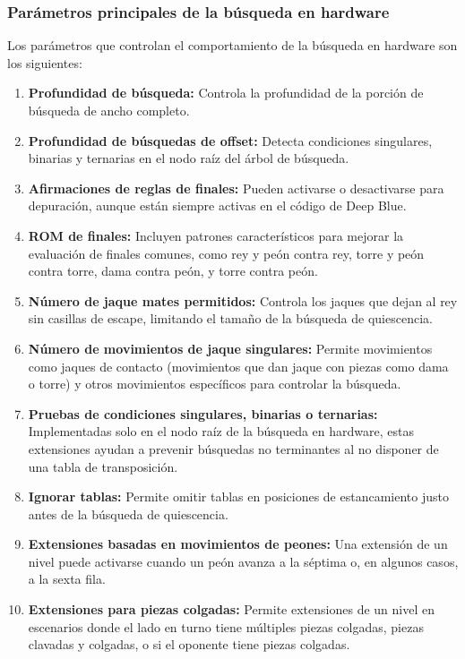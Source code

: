 \documentclass[12pt,a4paper]{article}
\begin{document}
\subsubsection*{Parámetros principales de la búsqueda en hardware}
Los parámetros que controlan el comportamiento de la búsqueda en hardware son los siguientes:
\begin{enumerate}
    \item \textbf{Profundidad de búsqueda:} Controla la profundidad de la porción de búsqueda de ancho completo.
    \item \textbf{Profundidad de búsquedas de offset:} Detecta condiciones singulares, binarias y ternarias en el nodo raíz del árbol de búsqueda.
    \item \textbf{Afirmaciones de reglas de finales:} Pueden activarse o desactivarse para depuración, aunque están siempre activas en el código de Deep Blue.
    \item \textbf{ROM de finales:} Incluyen patrones característicos para mejorar la evaluación de finales comunes, como rey y peón contra rey, torre y peón contra torre, dama contra peón, y torre contra peón.
    \item \textbf{Número de jaque mates permitidos:} Controla los jaques que dejan al rey sin casillas de escape, limitando el tamaño de la búsqueda de quiescencia.
    \item \textbf{Número de movimientos de jaque singulares:} Permite movimientos como jaques de contacto (movimientos que dan jaque con piezas como dama o torre) y otros movimientos específicos para controlar la búsqueda.
    \item \textbf{Pruebas de condiciones singulares, binarias o ternarias:} Implementadas solo en el nodo raíz de la búsqueda en hardware, estas extensiones ayudan a prevenir búsquedas no terminantes al no disponer de una tabla de transposición.
    \item \textbf{Ignorar tablas:} Permite omitir tablas en posiciones de estancamiento justo antes de la búsqueda de quiescencia.
    \item \textbf{Extensiones basadas en movimientos de peones:} Una extensión de un nivel puede activarse cuando un peón avanza a la séptima o, en algunos casos, a la sexta fila.
    \item \textbf{Extensiones para piezas colgadas:} Permite extensiones de un nivel en escenarios donde el lado en turno tiene múltiples piezas colgadas, piezas clavadas y colgadas, o si el oponente tiene piezas colgadas.
\end{enumerate}
\end{document}
